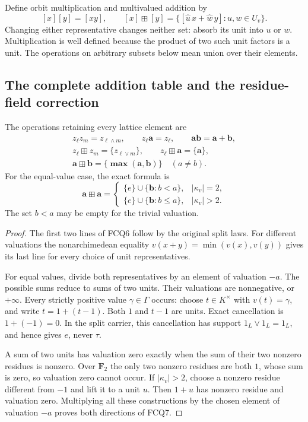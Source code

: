 Define orbit multiplication and multivalued addition by
\begin{equation}\tag{FCQ5}
[x][y]=[xy],\qquad
[x]\boxplus[y]=\{[\widehat u\,x+\widehat w\,y]:
                       u,w\in U_v\}.
\end{equation}
Changing either representative changes neither set: absorb its
unit into $u$ or $w$. Multiplication is well defined because
the product of two such unit factors is a unit. The operations
on arbitrary subsets below mean union over their elements.

\subsection{The complete addition table and the residue-field correction}

The operations retaining every lattice element are
\begin{equation}\tag{FCQ6}
\begin{gathered}
z_\ell z_m=z_{\ell\wedge m},\qquad
z_\ell\mathbf a=z_\ell,\qquad
\mathbf a\mathbf b=\mathbf{a+b},\\
z_\ell\boxplus z_m=\{z_{\ell\vee m}\},\qquad
z_\ell\boxplus\mathbf a=\{\mathbf a\},\\
\mathbf a\boxplus\mathbf b=\{\mathbf{\max(a,b)}\}
                    \quad(a\ne b).
\end{gathered}
\end{equation}
For the equal-value case, the exact formula is
\begin{equation}\tag{FCQ7}
\mathbf a\boxplus\mathbf a=
\begin{cases}
\{e\}\cup\{\mathbf b:b<a\},&|\kappa_v|=2,\\
\{e\}\cup\{\mathbf b:b\le a\},&|\kappa_v|>2.
\end{cases}
\end{equation}
The set $b<a$ may be empty for the trivial valuation.

\begin{proof}
The first two lines of FCQ6 follow by the original split laws.
For different valuations the nonarchimedean equality
$v(x+y)=\min(v(x),v(y))$ gives its last line for every choice
of unit representatives.

For equal values, divide both representatives by an element
of valuation $-a$. The possible sums reduce to sums of two
units. Their valuations are nonnegative, or $+\infty$.
Every strictly positive value $\gamma\in\Gamma$ occurs: choose
$t\in K^\times$ with $v(t)=\gamma$, and write
$t=1+(t-1)$. Both $1$ and $t-1$ are units. Exact cancellation
is $1+(-1)=0$. In the split carrier, this cancellation has
support $1_L\vee1_L=1_L$, and hence gives $e$, never $\tau$.

A sum of two units has valuation zero exactly when the sum
of their two nonzero residues is nonzero. Over $\mathbf F_2$
the only two nonzero residues are both $1$, whose sum is zero,
so valuation zero cannot occur. If $|\kappa_v|>2$, choose a
nonzero residue different from $-1$ and lift it to a unit $u$.
Then $1+u$ has nonzero residue and valuation zero. Multiplying
all these constructions by the chosen element of valuation
$-a$ proves both directions of FCQ7.
\end{proof}

